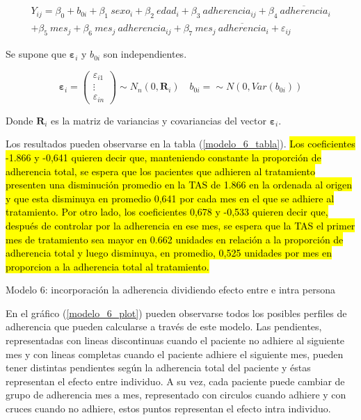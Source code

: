 \documentclass[spanish]{article}
\numberwithin{figure}{subsection}
\numberwithin{equation}{subsection}
\numberwithin{table}{subsection}
\begin{document}
\begin{multline}
	\label{modelo_6}
	Y_{ij} = \beta_0 + b_{0i} + \beta_1\ sexo_i + \beta_2\ edad_i + \beta_{3}\ adherencia_{ij} + \beta_4\ \overline{adherencia}_i \\
	+ \beta_5\ mes_j + \beta_6\ mes_j\ adherencia_{ij} + \beta_7\ mes_j\ \overline{adherencia}_i + \varepsilon_{ij}
\end{multline}

Se supone que $\bm{\varepsilon}_i$ y $b_{0i}$ son independientes.

\[ 
	\bm{\varepsilon}_i = \begin{pmatrix} \varepsilon_{i1} \\ \vdots \\ \varepsilon_{in} \end{pmatrix} \sim N_{n}(0, \bm{R}_i)
	\quad
	b_{0i} = \sim N(0, Var(b_{0i}))
\]

Donde $\bm{R}_i$ es la matriz de variancias y covariancias del vector
$\bm{\varepsilon}_i$.

Los resultados pueden observarse en la tabla (\ref{modelo_6_tabla}). \hl{Los
coeficientes -1.866 y -0,641 quieren decir que, manteniendo constante la
proporción de adherencia total, se espera que los pacientes que adhieren al
tratamiento presenten una disminución promedio en la TAS de 1.866 en la ordenada
al origen y que esta disminuya en promedio 0,641 por cada mes en el que se
adhiere al tratamiento. Por otro lado, los coeficientes 0,678 y -0,533 quieren
decir que, después de controlar por la adherencia en ese mes, se espera que la
TAS el primer mes de tratamiento sea mayor en 0.662 unidades en relación a la
proporción de adherencia total y luego disminuya, en promedio, 0,525 unidades
por mes en proporcion a la adherencia total al tratamiento.}

\begin{table}[H]
	\centering
	\caption{Modelo 6: incorporación la adherencia dividiendo efecto entre e
	intra persona}
	\label{modelo_6_tabla}
	
\end{table}

En el gráfico (\ref{modelo_6_plot}) pueden observarse todos los posibles perfiles
de adherencia que pueden calcularse a través de este modelo. Las pendientes,
representadas con lineas discontinuas cuando el paciente no adhiere al siguiente
mes y con lineas completas cuando el paciente adhiere el siguiente mes, pueden
tener distintas pendientes según la adherencia total del paciente y éstas
representan el efecto entre individuo. A su vez, cada paciente puede cambiar de
grupo de adherencia mes a mes, representado con circulos cuando adhiere y con
cruces cuando no adhiere, estos puntos representan el efecto intra individuo.
\end{document}
